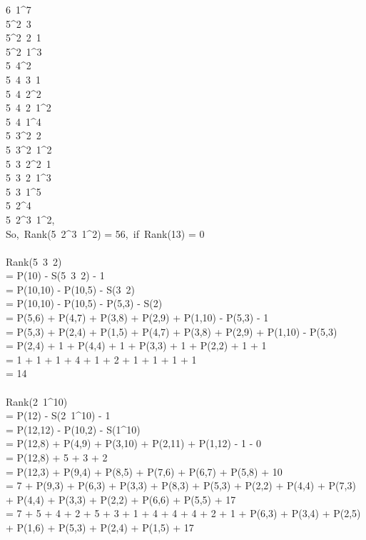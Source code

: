 \documentclass[11pt]{article} %
\begin{document}
\begin{enumerate}
\begin{enumerate}
			6\ 1^{7}\\
			5^{2}\ 3\\
			5^{2}\ 2\ 1\\
			5^{2}\ 1^{3}\\
			5\ 4^{2}\\
			5\ 4\ 3\ 1\\
			5\ 4\ 2^{2}\\
			5\ 4\ 2\ 1^{2}\\
			5\ 4\ 1^{4}\\
			5\ 3^{2}\ 2\\
			5\ 3^{2}\ 1^{2}\\
			5\ 3\ 2^{2}\ 1\\
			5\ 3\ 2\ 1^{3}\\
			5\ 3\ 1^{5}\\
			5\ 2^{4}\\
			5\ 2^{3}\ 1^{2},\\
			So,\ Rank(5\ 2^{3}\ 1^{2}) = 56,\ if\ Rank(13) = 0\\
			\\
			Rank(5\ 3\ 2)\\
			= P(10) - S(5\ 3\ 2) - 1\\
			= P(10,10) - P(10,5) - S(3\ 2)\\
			= P(10,10) - P(10,5) - P(5,3) - S(2)\\
			= P(5,6) + P(4,7) + P(3,8) + P(2,9) + P(1,10) - P(5,3) - 1\\
			= P(5,3) + P(2,4) + P(1,5) + P(4,7) + P(3,8) + P(2,9) + P(1,10) - P(5,3)\\
			= P(2,4) + 1 + P(4,4) + 1 + P(3,3) + 1 + P(2,2) + 1 + 1\\
			= 1 + 1 + 1 + 4 + 1 + 2 + 1 + 1 + 1 + 1\\
			= 14\\
			\\
			Rank(2\ 1^{10})\\
			= P(12) - S(2\ 1^{10}) - 1\\
			= P(12,12) - P(10,2) - S(1^{10}) \\
			= P(12,8) + P(4,9) + P(3,10) + P(2,11) + P(1,12) - 1 - 0\\
			= P(12,8) + 5 + 3 + 2\\
			= P(12,3) + P(9,4) + P(8,5) + P(7,6) + P(6,7) + P(5,8) + 10\\
			= 7 + P(9,3) + P(6,3) + P(3,3) + P(8,3) + P(5,3) + P(2,2) + P(4,4) + P(7,3) + P(4,4) + P(3,3) + P(2,2) + P(6,6) + P(5,5) + 17\\
			= 7 + 5 + 4 + 2 + 5 + 3 + 1 + 4 + 4 + 4 + 2 + 1 + P(6,3) + P(3,4) + P(2,5) + P(1,6) + P(5,3) + P(2,4) + P(1,5) + 17\\

\end{enumerate}
\end{enumerate}
\end{document}
